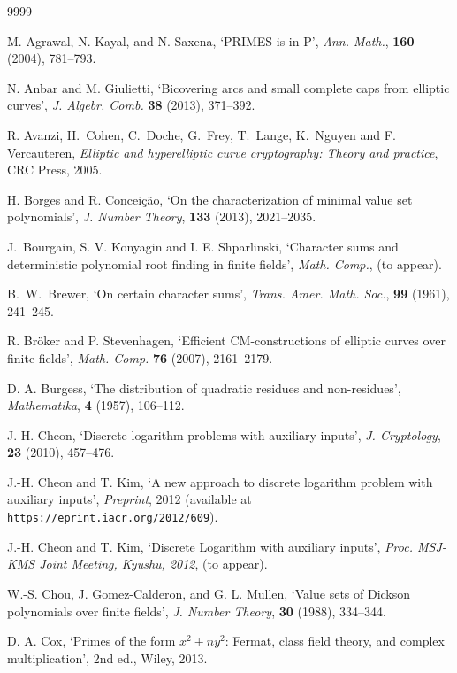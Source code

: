 \documentclass[12pt]{amsart}
\begin{document}
\begin{thebibliography}{9999}

 M. Agrawal, N. Kayal, and N. Saxena,
`{\rm PRIMES} is in {\rm P}', {\it Ann. Math.\/},
{\bf 160} (2004), 781--793.

 N. Anbar and M. Giulietti, 
`Bicovering arcs and small complete caps from elliptic
curves', {\it J. Algebr. Comb.\/} {\bf 38} (2013), 371--392.

R. Avanzi, H.~Cohen, C.~Doche, G.~Frey, T.~Lange,  K.~Nguyen and
F. Vercauteren,
{\it Elliptic and hyperelliptic curve cryptography: Theory and practice\/},
CRC Press, 2005.

 H. Borges and R. Concei{\c c}{\~a}o, `On the characterization
of minimal value set polynomials', 
{\it J. Number Theory\/}, {\bf 133} (2013),  2021--2035.


 J.~Bourgain, S. V. Konyagin and
I. E. Shparlinski, `Character sums and
deterministic polynomial root finding in finite fields',
{\it Math. Comp.\/}, (to appear).

 B.~W.~Brewer, `On certain character sums', {\it Trans. Amer. Math. Soc.\/}, {\bf 99} (1961), 241--245.

 R. Br\"oker and P. Stevenhagen,
`Efficient CM-constructions of elliptic curves over finite fields',
{\it Math. Comp.} {\bf 76} (2007), 2161--2179.

 D. A. Burgess, 
`The distribution of quadratic residues and non-residues',
{\it Mathematika\/}, {\bf 4} (1957), 106--112. 


 J.-H. Cheon, `Discrete logarithm problems
with auxiliary inputs', {\it J. Cryptology\/}, 
{\bf 23}  (2010), 457--476.


 J.-H. Cheon and T. Kim, `A new approach to discrete 
logarithm problem with auxiliary inputs', 
{\it Preprint\/}, 2012 (available
at {\tt https://eprint.iacr.org/2012/609}). 

 J.-H. Cheon and T. Kim, `Discrete Logarithm with auxiliary inputs', 
{\it Proc. MSJ-KMS Joint Meeting, Kyushu, 2012\/}, (to appear). 

 W.-S. Chou, J. Gomez-Calderon, and G. L. Mullen,
`Value sets of Dickson polynomials over finite fields', 
{\it J. Number Theory\/}, {\bf 30} (1988),  334--344.

 D. A. Cox, `Primes of the form $x^2+ny^2$: Fermat, class field theory, and complex multiplication', 2nd ed., Wiley, 2013.


\end{thebibliography}
\end{document}
